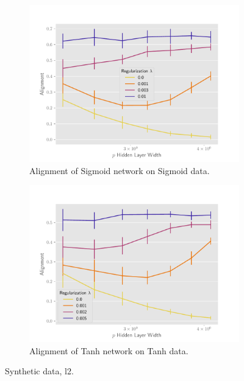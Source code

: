 \begin{figure}[h]
\medskip

\begin{subfigure}[b]{.49\textwidth}
  \centering
  \includegraphics[width=\linewidth]{figures/align_nn_sigmoid_autograd_l2_v3.pdf}
  \caption{Alignment of Sigmoid network on Sigmoid data.}
  \label{fig:align_nn_sigmoid_autograd_l2}
\end{subfigure}\hfill
\begin{subfigure}[b]{.49\textwidth}
  \centering
  \includegraphics[width=\linewidth]{figures/align_nn_tanh_autograd_l2_v3.pdf}
  \caption{Alignment of Tanh network on Tanh data.}
  \label{fig:align_nn_tanh_autograd_l2}
\end{subfigure}
\caption{Synthetic data, l2. }
\label{fig:synthetic-l2}
\end{figure}

